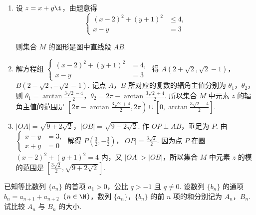 \documentclass[UTF8,a4paper,oneside,11pt]{ctexbook}
\begin{document}
\begin{solution}
\begin{enumerate}
\item 设 \(z=x+y\i\)，由题意得
\[
\left\{
\begin{aligned}
(x-2)^2+(y+1)^2&\leqslant 4,\\
x-y&=3
\end{aligned}
\right.%
\]


则集合 \(M\) 的图形是图中直线段 \(AB\).

\item 解方程组 \(\left\{\begin{aligned}(x-2)^2+(y+1)^2&=4,\\ x-y&=3\end{aligned}\right.\) 得 \(A(2+\sqrt{2},\sqrt{2}-1)\)，\(B(2-\sqrt{2},-\sqrt{2}-1)\). 记点 \(A\)，\(B\) 所对应的复数的辐角主值分别为 \(\theta_1\)，\(\theta_2\)，则 \(\theta_1=\arctan\frac{3\sqrt{2}-4}{2}\)，\(\theta_2=2\pi-\arctan\frac{3\sqrt{2}+4}{2}\). 所以集合 \(M\) 中元素 \(z\) 的辐角主值的范围是 \(\left[ 2\pi-\arctan\frac{3\sqrt{2}+4}{2},2\pi \right)\cup \left[ 0,\arctan\frac{3\sqrt{2}-4}{2} \right]\).

\item \(|OA|=\sqrt{9+2\sqrt{2}}\)，\(|OB|=\sqrt{9-2\sqrt{2}}\). 作 \(OP\perp AB\)，垂足为 \(P\). 由 \(\left\{\begin{aligned}x-y&=3,\\ x+y&=0\end{aligned}\right.\) 解得 \(P\left( \frac{3}{2},-\frac{3}{2} \right)\)，\(|OP|=\frac{3\sqrt{2}}{2}\). 因为点 \(P\) 在圆 \((x-2)^2+(y+1)^2=4\) 内，又 \(|OA|>|OB|\)，所以集合 \(M\) 中元素 \(z\) 的模的范围是 \(\left[ \frac{3\sqrt{2}}{2},\sqrt{9+2\sqrt{2}} \right]\).
\end{enumerate}
\end{solution}

\begin{problem}
已知等比数列 \(\{a_n\}\) 的首项 \(a_1>0\)，公比 \(q>-1\) 且 \(q\neq 0\). 设数列 \(\{b_n\}\) 的通项 \(b_n=a_{n+1}+a_{n+2}\)（\(n\in \N\)），数列 \(\{a_n\}\)，\(\{b_n\}\) 的前 \(n\) 项的和分别记为 \(A_n\)，\(B_n\). 试比较 \(A_n\) 与 \(B_n\) 的大小.
\end{problem}
\end{document}
